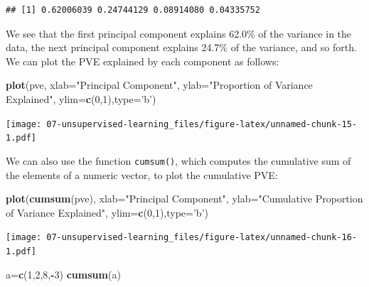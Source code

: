 \documentclass[openany]{book}
\newenvironment{Shaded}{\begin{snugshade}}{\end{snugshade}}
\newcommand{\DataTypeTok}[1]{\textcolor[rgb]{0.13,0.29,0.53}{#1}}
\newcommand{\DecValTok}[1]{\textcolor[rgb]{0.00,0.00,0.81}{#1}}
\newcommand{\KeywordTok}[1]{\textcolor[rgb]{0.13,0.29,0.53}{\textbf{#1}}}
\newcommand{\NormalTok}[1]{#1}
\newcommand{\OperatorTok}[1]{\textcolor[rgb]{0.81,0.36,0.00}{\textbf{#1}}}
\newcommand{\StringTok}[1]{\textcolor[rgb]{0.31,0.60,0.02}{#1}}
\begin{document}
\begin{verbatim}
## [1] 0.62006039 0.24744129 0.08914080 0.04335752
\end{verbatim}

We see that the first principal component explains 62.0\% of the variance
in the data, the next principal component explains 24.7\% of the variance,
and so forth. We can plot the PVE explained by each component as follows:

\begin{Shaded}
\begin{Highlighting}[]
\KeywordTok{plot}\NormalTok{(pve, }\DataTypeTok{xlab=}\StringTok{"Principal Component"}\NormalTok{, }\DataTypeTok{ylab=}\StringTok{"Proportion of Variance Explained"}\NormalTok{, }\DataTypeTok{ylim=}\KeywordTok{c}\NormalTok{(}\DecValTok{0}\NormalTok{,}\DecValTok{1}\NormalTok{),}\DataTypeTok{type=}\StringTok{'b'}\NormalTok{)}
\end{Highlighting}
\end{Shaded}

\texttt{[image: 07-unsupervised-learning\_files/figure-latex/unnamed-chunk-15-1.pdf]}

We can also use the function \texttt{cumsum()}, which computes the cumulative sum of the elements of a numeric vector, to plot the cumulative PVE:

\begin{Shaded}
\begin{Highlighting}[]
\KeywordTok{plot}\NormalTok{(}\KeywordTok{cumsum}\NormalTok{(pve), }\DataTypeTok{xlab=}\StringTok{"Principal Component"}\NormalTok{, }\DataTypeTok{ylab=}\StringTok{"Cumulative Proportion of Variance Explained"}\NormalTok{, }\DataTypeTok{ylim=}\KeywordTok{c}\NormalTok{(}\DecValTok{0}\NormalTok{,}\DecValTok{1}\NormalTok{),}\DataTypeTok{type=}\StringTok{'b'}\NormalTok{)}
\end{Highlighting}
\end{Shaded}

\texttt{[image: 07-unsupervised-learning\_files/figure-latex/unnamed-chunk-16-1.pdf]}

\begin{Shaded}
\begin{Highlighting}[]
\NormalTok{a=}\KeywordTok{c}\NormalTok{(}\DecValTok{1}\NormalTok{,}\DecValTok{2}\NormalTok{,}\DecValTok{8}\NormalTok{,}\OperatorTok{-}\DecValTok{3}\NormalTok{)}
\KeywordTok{cumsum}\NormalTok{(a)}
\end{Highlighting}
\end{Shaded}
\end{document}
